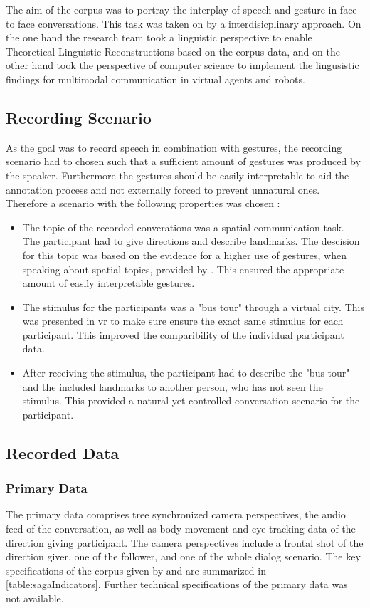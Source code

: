 \documentclass[a4paper]{article}
\begin{document}
		The aim of the corpus was to portray the interplay of speech and gesture in face to face conversations. This task was taken on by a interdisicplinary approach. On the one hand the research team took a linguistic perspective to enable Theoretical Linguistic Reconstructions based on the corpus data, and on the other hand took the perspective of computer science to implement the lingusistic findings for multimodal communication in virtual agents and robots. \cite[ch. 1]{Bielefeld2010}
	
		\subsection{Recording Scenario}
			As the goal was to record speech in combination with gestures, the recording scenario had to chosen such that a sufficient amount of gestures was produced by the speaker. Furthermore the gestures should be easily interpretable to aid the annotation process and not externally forced to prevent unnatural ones. Therefore a scenario with the following properties was chosen \cite[ch. 2]{Bielefeld2010}:	
			\begin{itemize}
				\item The topic of the recorded converations was a spatial communication task. The participant had to give directions and describe landmarks. The descision for this topic was based on the evidence for a higher use of gestures, when speaking about spatial topics, provided by \cite[p. 313]{Alibali2005}. This ensured the appropriate amount of easily interpretable gestures.
				\item The stimulus for the participants was a "bus tour" through a virtual city. This was presented in \gls{vr} to make sure ensure the exact same stimulus for each participant. This improved the comparibility of the individual participant data.
				\item After receiving the stimulus, the participant had to describe the "bus tour" and the included landmarks to another person, who has not seen the stimulus. This provided a natural yet controlled conversation scenario for the participant.
			\end{itemize}	
						
		\subsection{Recorded Data}
			\subsubsection{Primary Data}
				The primary data comprises tree synchronized camera perspectives, the audio feed of the conversation, as well as body movement and eye tracking data of the direction giving participant. The camera perspectives include a frontal shot of the direction giver, one of the follower, and one of the whole dialog scenario. The key specifications of the corpus given by \cite[ch. 2.1]{Bielefeld2010} and \cite{BAS2014} are summarized in \ref{table:sagaIndicators}. Further technical specifications of the primary data was not available.
				
\end{document}
